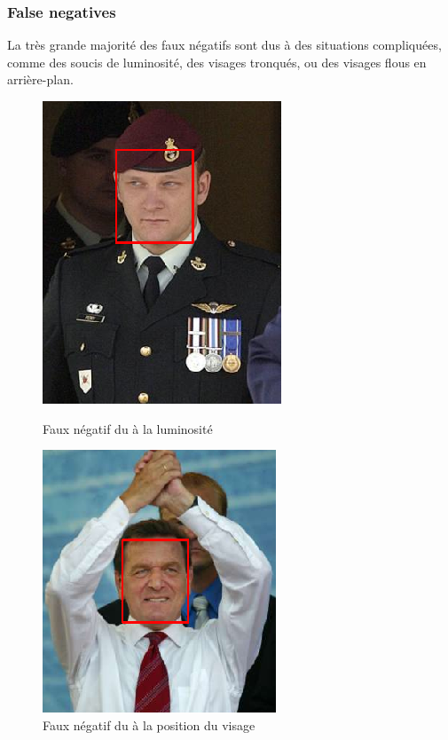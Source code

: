 \documentclass[a4paper,11pt]{article}
\begin{document}
\subsubsection{False negatives}

La très grande majorité des faux négatifs sont dus à des situations compliquées, comme des soucis de luminosité, des visages tronqués, ou des visages flous en arrière-plan.\\

\begin{figure}[H]
    \centering
    \begin{minipage}[c]{0.45\linewidth}
        \begin{center}
            \includegraphics[scale=0.45]{facenetFN1.png}
            \caption{Faux négatif du à la luminosité}
        \end{center}
    \end{minipage} \hfill
    \begin{minipage}[c]{0.50\linewidth}
        \begin{center}
            \includegraphics[scale=0.47]{facenetFN2.png}
            \caption{Faux négatif du à la position du visage}
        \end{center}
    \end{minipage}
\end{figure}
\end{document}
